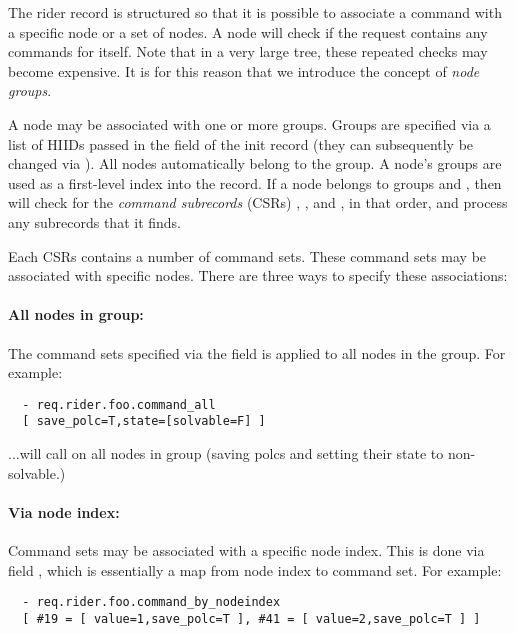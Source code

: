 \documentclass[10pt]{article}
\begin{document}
  The rider record is structured so that it is possible to associate a command
  with a specific node or a set of nodes. A node will check if the request
  contains any commands for itself. Note that in a very large tree, these
  repeated checks may become expensive. It is for this reason that we introduce
  the concept of {\em node groups}. 
  
  A node may be associated with one or more groups. Groups are specified via a
  list of HIIDs passed in the  field of the init record (they
  can subsequently be changed via ). All nodes automatically
  belong to the  group. A node's groups are used as a first-level index
  into the  record. If a node belongs to groups  and
  , then  will check for the {\em command
  subrecords}\/ (CSRs) , , and , in
  that order, and process any subrecords that it finds.

  Each CSRs contains a number of command sets. These command sets may be
  associated with specific nodes. There are three ways to specify these
  associations:
  
  \paragraph{All nodes in group:} The command sets specified via the field
   is applied to all nodes in the group. For example:

\begin{verbatim}
  - req.rider.foo.command_all
  [ save_polc=T,state=[solvable=F] ]  
\end{verbatim}

  ...will call  on all nodes in group  (saving
  polcs and setting their state to non-solvable.)

  \paragraph{Via node index:} Command sets may be associated with a specific
  node index. This is done via field , which is
  essentially a map from node index to command set. For example:

\begin{verbatim}
  - req.rider.foo.command_by_nodeindex
  [ #19 = [ value=1,save_polc=T ], #41 = [ value=2,save_polc=T ] ]
\end{verbatim}
\end{document}
